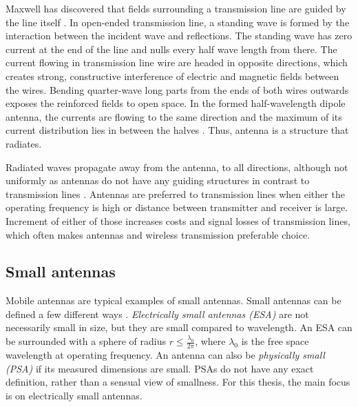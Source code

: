 Maxwell has discovered that fields surrounding a transmission line are guided by the line itself \cite{stutzman}. In open-ended transmission line, a standing wave is formed by the interaction between the incident wave and reflections. The standing wave has zero current at the end of the line and nulls every half wave length from there. The current flowing in transmission line wire are headed in opposite directions, which creates strong, constructive interference of electric and magnetic fields between the wires. Bending quarter-wave long parts from the ends of both wires outwards exposes the reinforced fields to open space. In the formed half-wavelength dipole antenna, the currents are flowing to the same direction and the maximum of its current distribution lies in between the halves \cite{stutzman}. Thus, antenna is a structure that radiates. %

Radiated waves propagate away from the antenna, to all directions, although not uniformly as antennas do not have any guiding structures in contrast to transmission lines \cite{stutzman}. Antennas are preferred to transmission lines when either the operating frequency is high or distance between transmitter and receiver is large. Increment of either of those increases costs and signal losses of transmission lines, which often makes antennas and wireless transmission preferable choice. %


\subsection{Small antennas}
\label{sec:small_antennas}
Mobile antennas are typical examples of small antennas. Small antennas can be defined a few different ways \cite{modern_small_antennas}. \emph{Electrically small antennas (ESA)} are not necessarily small in size, but they are small compared to wavelength. An ESA can be surrounded with a sphere of radius $r\leq\frac{\lambda_0}{2\pi}$, where $\lambda_0$ is the free space wavelength at operating frequency. An antenna can also be \emph{physically small (PSA)} if its measured dimensions are small. PSAs do not have any exact definition, rather than a sensual view of smallness. For this thesis, the main focus is on electrically small antennas.

